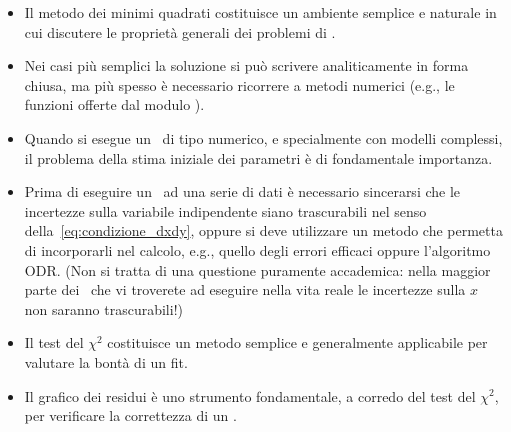 \begin{itemize}
  \item Il metodo dei minimi quadrati costituisce un ambiente semplice e naturale
  in cui discutere le proprietà generali dei problemi di \fitting.
  \item Nei casi più semplici la soluzione si può scrivere analiticamente in
  forma chiusa, ma più spesso è necessario ricorrere a metodi numerici
  (e.g., le funzioni offerte dal modulo ).
  \item Quando si esegue un \fit\ di tipo numerico, e specialmente con modelli
  complessi, il problema della stima iniziale dei parametri è di
  fondamentale importanza.
  \item Prima di eseguire un \fit\ ad una serie di dati è necessario
  sincerarsi che le incertezze sulla variabile indipendente siano trascurabili
  nel senso della~\eqref{eq:condizione_dxdy}, oppure si deve utilizzare un
  metodo che permetta di incorporarli nel calcolo, e.g., quello degli errori
  efficaci oppure l'algoritmo ODR. (Non si tratta di una questione puramente
  accademica: nella maggior parte dei \fit\ che vi troverete ad eseguire
  nella vita reale le incertezze sulla $x$ non saranno trascurabili!)
  \item Il test del $\chi^2$ costituisce un metodo semplice e generalmente
  applicabile per valutare la bontà di un fit.
  \item Il grafico dei residui è uno strumento fondamentale, a corredo del
  test del $\chi^2$, per verificare la correttezza di un \fit.
\end{itemize}
